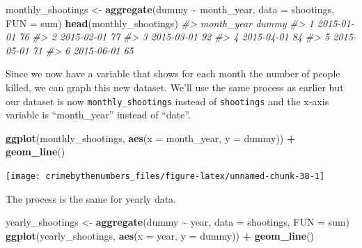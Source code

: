\documentclass[
  12pt,
]{book}
\newenvironment{Shaded}{\begin{snugshade}}{\end{snugshade}}
\newcommand{\CommentTok}[1]{\textcolor[rgb]{0.37,0.37,0.37}{\textit{#1}}}
\newcommand{\DataTypeTok}[1]{\textcolor[rgb]{0.27,0.27,0.27}{#1}}
\newcommand{\KeywordTok}[1]{\textcolor[rgb]{0.27,0.27,0.27}{\textbf{#1}}}
\newcommand{\NormalTok}[1]{#1}
\newcommand{\OperatorTok}[1]{\textcolor[rgb]{0.43,0.43,0.43}{\textbf{#1}}}
\newcommand{\StringTok}[1]{\textcolor[rgb]{0.5,0.5,0.5}{#1}}
\begin{document}
\begin{Shaded}
\begin{Highlighting}[]
\NormalTok{monthly\_shootings \textless{}{-}}\StringTok{ }\KeywordTok{aggregate}\NormalTok{(dummy }\OperatorTok{\textasciitilde{}}\StringTok{ }\NormalTok{month\_year, }\DataTypeTok{data =}\NormalTok{ shootings, }\DataTypeTok{FUN =}\NormalTok{ sum)}
\KeywordTok{head}\NormalTok{(monthly\_shootings)}
\CommentTok{\#\textgreater{}   month\_year dummy}
\CommentTok{\#\textgreater{} 1 2015{-}01{-}01    76}
\CommentTok{\#\textgreater{} 2 2015{-}02{-}01    77}
\CommentTok{\#\textgreater{} 3 2015{-}03{-}01    92}
\CommentTok{\#\textgreater{} 4 2015{-}04{-}01    84}
\CommentTok{\#\textgreater{} 5 2015{-}05{-}01    71}
\CommentTok{\#\textgreater{} 6 2015{-}06{-}01    65}
\end{Highlighting}
\end{Shaded}

Since we now have a variable that shows for each month the number of people killed, we can graph this new dataset. We'll use the same process as earlier but our dataset is now \texttt{monthly\_shootings} instead of \texttt{shootings} and the x-axis variable is ``month\_year'' instead of ``date''.

\begin{Shaded}
\begin{Highlighting}[]
\KeywordTok{ggplot}\NormalTok{(monthly\_shootings, }\KeywordTok{aes}\NormalTok{(}\DataTypeTok{x =}\NormalTok{ month\_year, }\DataTypeTok{y =}\NormalTok{ dummy)) }\OperatorTok{+}
\StringTok{  }\KeywordTok{geom\_line}\NormalTok{()}
\end{Highlighting}
\end{Shaded}

\begin{center}\texttt{[image: crimebythenumbers\_files/figure-latex/unnamed-chunk-38-1]} \end{center}

The process is the same for yearly data.

\begin{Shaded}
\begin{Highlighting}[]
\NormalTok{yearly\_shootings \textless{}{-}}\StringTok{ }\KeywordTok{aggregate}\NormalTok{(dummy }\OperatorTok{\textasciitilde{}}\StringTok{ }\NormalTok{year, }\DataTypeTok{data =}\NormalTok{ shootings, }\DataTypeTok{FUN =}\NormalTok{ sum)}
\KeywordTok{ggplot}\NormalTok{(yearly\_shootings, }\KeywordTok{aes}\NormalTok{(}\DataTypeTok{x =}\NormalTok{ year, }\DataTypeTok{y =}\NormalTok{ dummy)) }\OperatorTok{+}
\StringTok{  }\KeywordTok{geom\_line}\NormalTok{()}
\end{Highlighting}
\end{Shaded}
\end{document}
